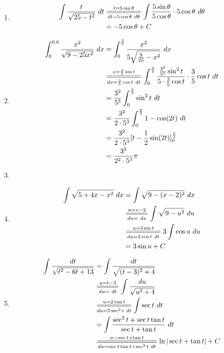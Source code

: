 \documentclass{article}
\begin{document}
\begin{enumerate}[label={\bf{}\arabic*}.]
\item%
	\begin{align*}
	\int\frac{t}{\sqrt{25-t^2}}\ dt&\overset{t=5\sin\theta}{\underset{dt=5\cos\theta\ d\theta}{=\joinrel=\joinrel=\joinrel=\joinrel=\joinrel=\joinrel=\joinrel=}}\int\frac{5\sin\theta}{5\cos\theta}\cdot5\cos\theta\ d\theta\\
	&=-5\cos\theta+C
	\end{align*}

\item%
	\begin{align*}
	\int_0^{0.6}\frac{x^2}{\sqrt{9-25x^2}}\ dx&=\int_0^\frac{3}{5}\frac{x^2}{5\sqrt{\frac{9}{25}-x^2}}\ dx\\
	&\overset{x=\frac{3}{5}\sin t}{\underset{dx=\frac{3}{5}\cos t\ dt}{=\joinrel=\joinrel=\joinrel=\joinrel=\joinrel=\joinrel=\joinrel=}}\int_0^\frac{\pi}{2}\frac{\frac{3^2}{5^2}\sin^2t}{5\cdot\frac{3}{5}\cos t}\cdot\frac{3}{5}\cos t\ dt\\
	&=\frac{3^2}{5^3}\int_0^\frac{\pi}{2}\sin^2t\ dt\\
	&=\frac{3^2}{2\cdot5^3}\int_0^\frac{\pi}{2}1-\cos(2t)\ dt\\
	&=\frac{3^2}{2\cdot5^3}[t-\frac{1}{2}\sin(2t)]_0^\frac{\pi}{2}\\
	&=\frac{3^2}{2^2\cdot5^3}\pi
	\end{align*}

\color{red}\item[\refstepcounter{enumi}\fbox{\number\value{enumi}.}]\color{black}%

\item%
	\begin{align*}
	\int\sqrt{5+4x-x^2}\ dx&=\int\sqrt{9-(x-2)^2}\ dx\\
	&\overset{u=x-2}{\underset{du=\ dx}{=\joinrel=\joinrel=\joinrel=\joinrel=}}\int\sqrt{9-u^2}\ du\\
	&\overset{u=3\sin t}{\underset{du=3\cos t\ dt}{=\joinrel=\joinrel=\joinrel=\joinrel=\joinrel=\joinrel=\joinrel=}}3\int\cos u\ du\\
	&=3\sin u+C
	\end{align*}

\item%
	\begin{align*}
	\int\frac{dt}{\sqrt{t^2-6t+13}}&=\int\frac{dt}{\sqrt{(t-3)^2+4}}\\
	&\overset{u=t-3}{\underset{du=\ dt}{=\joinrel=\joinrel=\joinrel=\joinrel=}}\int\frac{du}{\sqrt{u^2+4}}\\
	&\overset{u=2\tan t}{\underset{du=2\sec^2 t\ dt}{=\joinrel=\joinrel=\joinrel=\joinrel=\joinrel=\joinrel=\joinrel=}}\int\sec t\ dt\\
	&=\int\frac{\sec^2t+\sec t\tan t}{\sec t+\tan t}\ dt\\
	&\overset{w=\sec t+\tan t}{\underset{dw=\sec t\tan t+\sec^2t\ dt}{=\joinrel=\joinrel=\joinrel=\joinrel=\joinrel=\joinrel=\joinrel=\joinrel=\joinrel=\joinrel=\joinrel=\joinrel=\joinrel=}}\ln|\sec t+\tan t|+C
	\end{align*}


\end{enumerate}
\end{document}
